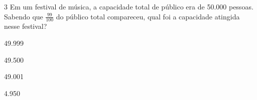 








\num{3} Em um festival de música, a capacidade total de público era de 50.000
pessoas. Sabendo que $\frac{99}{100}$ do público total compareceu,
qual foi a capacidade atingida nesse festival?

\begin{escolha}
\item 49.999
\item 49.500
\item 49.001
\item 4.950
\end{escolha}







